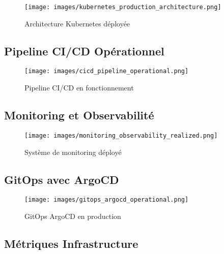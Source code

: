 \begin{table}[H]
\begin{figure}[H]
    \centering
    \texttt{[image: images/kubernetes\_production\_architecture.png]}
    \caption{Architecture Kubernetes déployée}
    \label{fig:kubernetes_production}
\end{figure}

\subsection{Pipeline CI/CD Opérationnel}

\begin{figure}[H]
    \centering
    \texttt{[image: images/cicd\_pipeline\_operational.png]}
    \caption{Pipeline CI/CD en fonctionnement}
    \label{fig:cicd_operational}
\end{figure}

\subsection{Monitoring et Observabilité}

\begin{figure}[H]
    \centering
    \texttt{[image: images/monitoring\_observability\_realized.png]}
    \caption{Système de monitoring déployé}
    \label{fig:monitoring_deployed}
\end{figure}

\subsection{GitOps avec ArgoCD}

\begin{figure}[H]
    \centering
    \texttt{[image: images/gitops\_argocd\_operational.png]}
    \caption{GitOps ArgoCD en production}
    \label{fig:gitops_operational}
\end{figure}

\subsection{Métriques Infrastructure}


\end{table}
